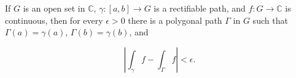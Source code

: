 If $G$ is an open set in $\mathbb{C}$, $\gamma: [a,b] \to G$ is a rectifiable path, and $f: G \to \mathbb{C}$ is continuous, then for every $\epsilon > 0$ there is a polygonal path $\Gamma$ in $G$ such that $\Gamma(a) = \gamma(a)$, $\Gamma(b) = \gamma(b)$, and

$$\left| \int_{\gamma} f - \int_{\Gamma} f \right| < \epsilon.$$
